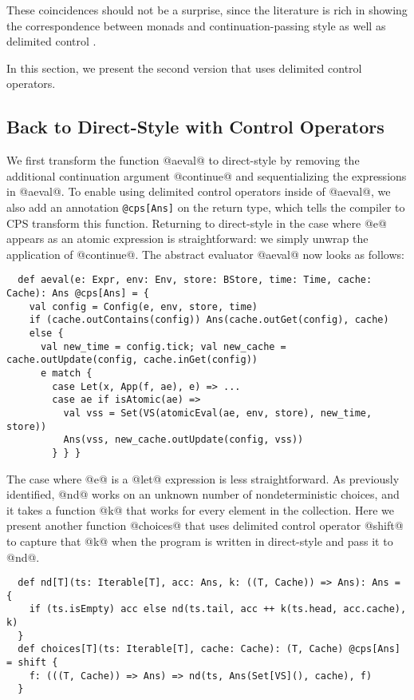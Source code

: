 \documentclass[acmsmall, screen]{acmart}\settopmatter{}
\begin{document}
These coincidences should not be a surprise, since the literature is rich
in showing the correspondence between monads and continuation-passing style as well as
delimited control \cite{Danvy:1990:AC:91556.91622, wadler1992essence,
danvy1992representing, moggi1991notions}.

In this section, we present the second version that uses delimited control operators.

\subsection{Back to Direct-Style with Control Operators} \label{uncps}

We first transform the function @aeval@ to direct-style by removing the additional
continuation argument @continue@ and sequentializing the expressions in @aeval@.
To enable using delimited control operators inside of @aeval@, we also add an
annotation \verb|@cps[Ans]| on the return type, which tells the compiler to CPS
transform this function.
Returning to direct-style in the case where @e@ appears as an atomic expression is straightforward:
we simply unwrap the application of @continue@. The abstract evaluator @aeval@ now looks as follows:

\begin{lstlisting}
  def aeval(e: Expr, env: Env, store: BStore, time: Time, cache: Cache): Ans @cps[Ans] = {
    val config = Config(e, env, store, time)
    if (cache.outContains(config)) Ans(cache.outGet(config), cache)
    else {
      val new_time = config.tick; val new_cache = cache.outUpdate(config, cache.inGet(config))
      e match {
        case Let(x, App(f, ae), e) => ...
        case ae if isAtomic(ae) =>
          val vss = Set(VS(atomicEval(ae, env, store), new_time, store))
          Ans(vss, new_cache.outUpdate(config, vss))
        } } }
\end{lstlisting}

The case where @e@ is a @let@ expression is less straightforward. As
previously identified, @nd@ works on an unknown number of
nondeterministic choices, and it takes a
function @k@ that works for every element in the collection. Here we present another
function @choices@ that uses delimited control operator @shift@ to capture that @k@
when the program is written in direct-style and pass it to @nd@.

\begin{lstlisting}
  def nd[T](ts: Iterable[T], acc: Ans, k: ((T, Cache)) => Ans): Ans = {
    if (ts.isEmpty) acc else nd(ts.tail, acc ++ k(ts.head, acc.cache), k)
  }
  def choices[T](ts: Iterable[T], cache: Cache): (T, Cache) @cps[Ans] = shift {
    f: (((T, Cache)) => Ans) => nd(ts, Ans(Set[VS](), cache), f)
  }
\end{lstlisting}
\end{document}
